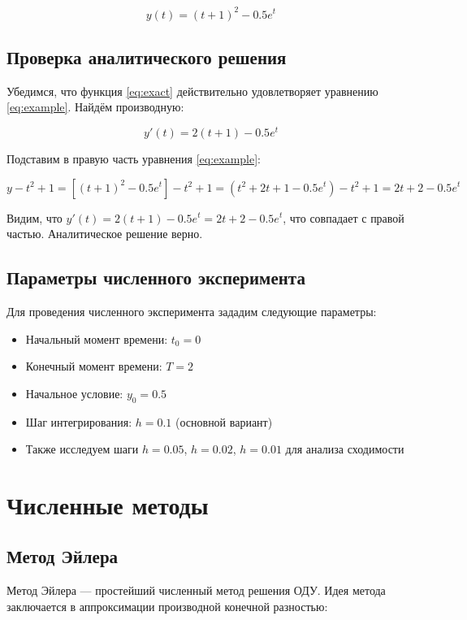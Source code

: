\documentclass[a4paper,12pt]{article}
\begin{document}
\begin{equation}
    y(t) = (t+1)^2 - 0.5e^t \label{eq:exact}
\end{equation}

\subsection{Проверка аналитического решения}
Убедимся, что функция \eqref{eq:exact} действительно удовлетворяет уравнению \eqref{eq:example}. Найдём производную:

\[
y'(t) = 2(t+1) - 0.5e^t
\]

Подставим в правую часть уравнения \eqref{eq:example}:

\[
y - t^2 + 1 = \left[(t+1)^2 - 0.5e^t\right] - t^2 + 1 = (t^2 + 2t + 1 - 0.5e^t) - t^2 + 1 = 2t + 2 - 0.5e^t
\]

Видим, что \(y'(t) = 2(t+1) - 0.5e^t = 2t + 2 - 0.5e^t\), что совпадает с правой частью. Аналитическое решение верно.

\subsection{Параметры численного эксперимента}
Для проведения численного эксперимента зададим следующие параметры:
\begin{itemize}
    \item Начальный момент времени: \(t_0 = 0\)
    \item Конечный момент времени: \(T = 2\)
    \item Начальное условие: \(y_0 = 0.5\)
    \item Шаг интегрирования: \(h = 0.1\) (основной вариант)
    \item Также исследуем шаги \(h = 0.05\), \(h = 0.02\), \(h = 0.01\) для анализа сходимости
\end{itemize}

\newpage

\section{Численные методы}

\subsection{Метод Эйлера}

Метод Эйлера — простейший численный метод решения ОДУ. Идея метода заключается в аппроксимации производной конечной разностью:
\end{document}
